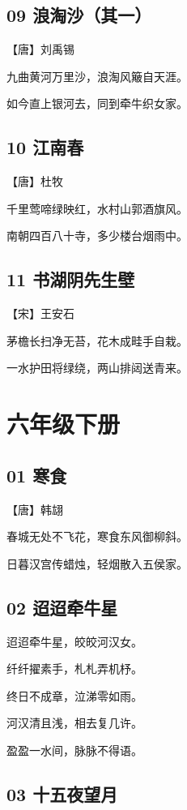 \documentclass[a6paper, 12pt]{article}
\begin{document}
\subsection*{09 浪淘沙（其一）}

【唐】刘禹锡

九曲黄河万里沙，浪淘风簸自天涯。

如今直上银河去，同到牵牛织女家。

\subsection*{10 江南春}

【唐】杜牧

千里莺啼绿映红，水村山郭酒旗风。

南朝四百八十寺，多少楼台烟雨中。

\subsection*{11 书湖阴先生壁}

【宋】王安石

茅檐长扫净无苔，花木成畦手自栽。

一水护田将绿绕，两山排闼送青来。

\newpage

\section*{六年级下册}

\subsection*{01 寒食}

【唐】韩翃

春城无处不飞花，寒食东风御柳斜。

日暮汉宫传蜡烛，轻烟散入五侯家。

\subsection*{02 迢迢牵牛星}

迢迢牵牛星，皎皎河汉女。

纤纤擢素手，札札弄机杼。

终日不成章，泣涕零如雨。

河汉清且浅，相去复几许。

盈盈一水间，脉脉不得语。

\subsection*{03 十五夜望月}
\end{document}
